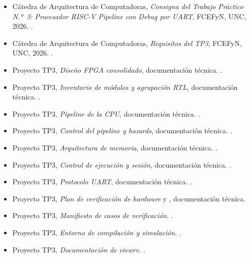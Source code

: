 \begingroup
\small
\setlength{\parskip}{0pt}
\begin{itemize}
  \setlength{\itemsep}{0.25em}
  \raggedright
  \item Cátedra de Arquitectura de Computadoras, \textit{Consigna del Trabajo
    Práctico N.º~3: Procesador RISC-V Pipeline con Debug por UART}, FCEFyN,
    UNC, 2026. .
  \item Cátedra de Arquitectura de Computadoras, \textit{Requisitos del TP3},
    FCEFyN, UNC, 2026. .
  \item Proyecto TP3, \textit{Diseño FPGA consolidado}, documentación técnica.
    .
  \item Proyecto TP3, \textit{Inventario de módulos y agrupación RTL},
    documentación técnica.
    .
  \item Proyecto TP3, \textit{Pipeline de la CPU}, documentación técnica.
    .
  \item Proyecto TP3, \textit{Control del pipeline y hazards}, documentación
    técnica.
    .
  \item Proyecto TP3, \textit{Arquitectura de memoria}, documentación técnica.
    .
  \item Proyecto TP3, \textit{Control de ejecución y sesión}, documentación
    técnica.
    .
  \item Proyecto TP3, \textit{Protocolo UART}, documentación técnica.
    .
  \item Proyecto TP3, \textit{Plan de verificación de hardware} y
    , documentación técnica.
  \item Proyecto TP3, \textit{Manifiesto de casos de verificación}.
    .
  \item Proyecto TP3, \textit{Entorno de compilación y simulación}.
    .
  \item Proyecto TP3, \textit{Documentación de viewrv}.
    .

\end{itemize}

